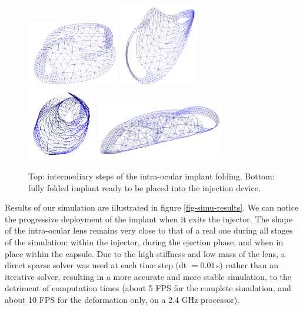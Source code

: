 \documentclass{llncs}
\begin{document}
\begin{figure}[!h]
\centering
\includegraphics[width=4cm]{images/implant_folding1}
\includegraphics[width=3.5cm]{images/implant_folding2} \\
\includegraphics[width=3cm]{images/implant_folding3}
\includegraphics[width=5.5cm]{images/implant_folding4}
\caption [Folding of intra-ocular implant] {Top: intermediary steps of the intra-ocular implant folding. Bottom: fully folded implant ready to be placed into the injection device.}
\label{fig-implantFolding}
\end{figure}

Results of our simulation are illustrated in figure \ref{fig-simu-results}. We can notice the progressive deployment of the implant when it exits the injector.  The shape of the intra-ocular lens remains very close to that of a real one during all stages of the simulation: within the injector, during the ejection phase, and when in place within the capsule. Due to the high stiffness and low mass of the lens, a direct sparse solver was used at each time step (dt $= 0.01$\,s) rather than an iterative solver, resulting in a more accurate and more stable simulation, to the detriment of computation times (about 5 FPS for the complete simulation, and about 10 FPS for the deformation only, on a 2.4 GHz processor).
\end{document}
